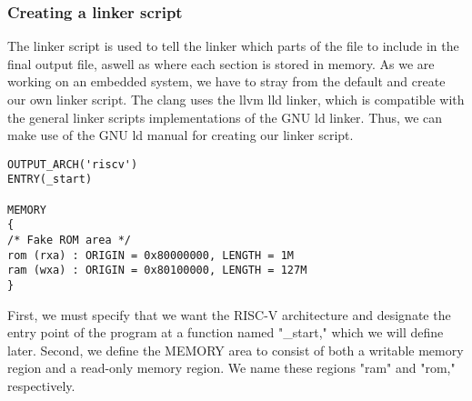 \subsubsection{Creating a linker script}
The linker script is used to tell the linker which parts of the file to include
in the final output file, aswell as where each section is stored in memory. As
we are working on an embedded system, we have to stray from the default and
create our own linker script. The clang uses the llvm lld linker, which is compatible
with the general linker scripts implementations of the GNU ld linker\cite{llvm-org-linker}.
Thus, we can make use of the GNU ld manual for creating our linker script\cite{GNU-linker}.
\begin{lstlisting}
OUTPUT_ARCH('riscv')
ENTRY(_start)

MEMORY
{
/* Fake ROM area */
rom (rxa) : ORIGIN = 0x80000000, LENGTH = 1M
ram (wxa) : ORIGIN = 0x80100000, LENGTH = 127M
}
\end{lstlisting}
First, we must specify that we want the RISC-V architecture and designate the entry point
of the program at a function named "\_start," which we will define later.
Second, we define the MEMORY area to consist of both a writable memory region and a read-only
memory region. We name these regions "ram" and "rom," respectively.
